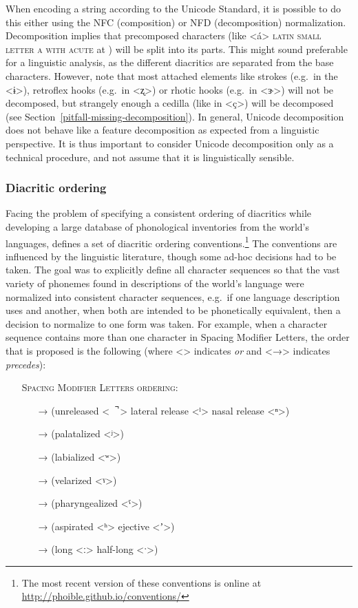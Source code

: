 When encoding a string according to the Unicode Standard, it is possible to do
this either using the NFC (composition) or NFD (decomposition) normalization.
Decomposition implies that precomposed characters (like <á> \textsc{latin small
letter a with acute} at ) will be split into its parts. This might
sound preferable for a linguistic analysis, as the different diacritics are
separated from the base characters. However, note that most attached elements
like strokes (e.g.~in the <ɨ>), retroflex hooks (e.g.~in <ʐ>) or rhotic hooks
(e.g.~in <ɝ>) will not be decomposed, but strangely enough a cedilla (like in
<ç>) will be decomposed (see Section~\ref{pitfall-missing-decomposition}). In
general, Unicode decomposition does not behave like a feature decomposition as
expected from a linguistic perspective. It is thus important to consider Unicode
decomposition only as a technical procedure, and not assume that it is
linguistically sensible.

\subsubsection*{Diacritic ordering}

Facing the problem of specifying a consistent ordering of diacritics while
developing a large database of phonological inventories from the world's
languages, \citet[540]{Moran2012} defines a set of diacritic ordering
conventions.\footnote{The most recent version of these conventions is online at
\url{http://phoible.github.io/conventions/}} The conventions are influenced by
the linguistic literature, though some ad-hoc decisions had to be taken. The
goal was to explicitly define all character sequences so that the vast variety
of phonemes found in descriptions of the world's language were normalized into
consistent character sequences, e.g.~if one language description uses and
another, when both are intended to be phonetically equivalent, then a decision
to normalize to one form was taken. For example, when a character sequence
contains more than one character in Spacing Modifier Letters, the order that is
proposed is the following (where <\textbar{}> indicates \textit{or} and <→>
indicates \textit{precedes}):

\begin{itemize}
	\item[] \textsc{Spacing Modifier Letters ordering:}
	\begin{itemize}
	  \item[→] (unreleased <\ \ ̚ > \textbar{} lateral release <ˡ> \textbar{} nasal release <ⁿ>)
	  \item[→] (palatalized <ʲ>)
	  \item[→] (labialized <ʷ>)
	  \item[→] (velarized <ˠ>)
	  \item[→] (pharyngealized <ˤ>)
	  \item[→] (aspirated <ʰ> \textbar{} ejective <ʼ>)
	  \item[→] (long <ː> \textbar{} half-long <ˑ>)
	\end{itemize}
\end{itemize}

